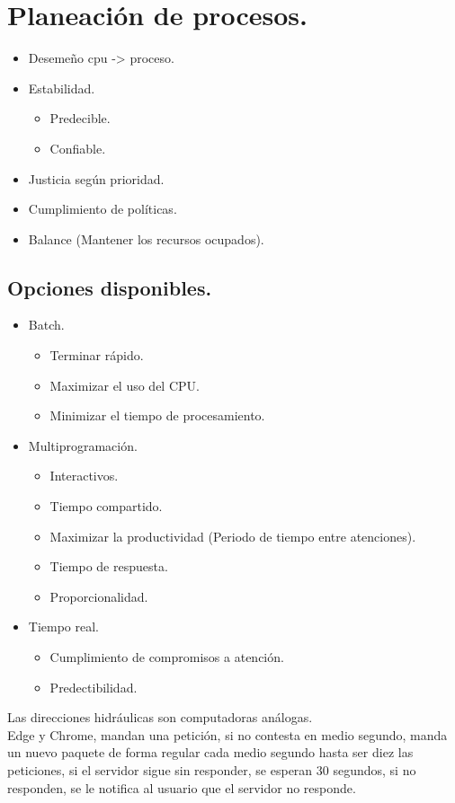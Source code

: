 \newpage
\chapter{Planeaci\'{o}n de procesos.}
\begin{itemize}
	\item Deseme\~{n}o cpu -> proceso.
	\item Estabilidad.
		\begin{itemize}
			\item Predecible.
			\item Confiable.
		\end{itemize}
	\item Justicia seg\'{u}n prioridad.
	\item Cumplimiento de pol\'{i}ticas.
	\item Balance (Mantener los recursos ocupados).
\end{itemize}

\section{Opciones disponibles.}
\begin{itemize}
	\item Batch.\\
		\begin{itemize}
			\item Terminar r\'{a}pido.
			\item Maximizar el uso del CPU.
			\item Minimizar el tiempo de procesamiento.
		\end{itemize}
	\item Multiprogramaci\'{o}n.
		\begin{itemize}
			\item Interactivos.
			\item Tiempo compartido.
			\item Maximizar la productividad (Periodo de tiempo entre atenciones).
			\item Tiempo de respuesta.
			\item Proporcionalidad.
		\end{itemize}
	\item Tiempo real.
		\begin{itemize}
			\item Cumplimiento de compromisos a atenci\'{o}n.
			\item Predectibilidad.
		\end{itemize}
\end{itemize}
Las direcciones hidr\'{a}ulicas son computadoras an\'{a}logas.\\
Edge y Chrome, mandan una petici\'{o}n, si no contesta en medio segundo, manda un nuevo paquete de forma regular cada medio segundo hasta ser diez las peticiones, si el servidor sigue sin responder, se esperan 30 segundos, si no responden, se le notifica al usuario que el servidor no responde.\\

